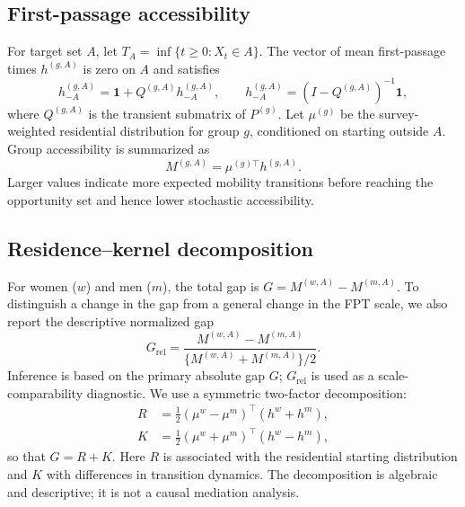 \documentclass[11pt]{article}
\begin{document}
\subsection{First-passage accessibility}
For target set $A$, let $T_A=\inf\{t\geq0:X_t\in A\}$. The vector of mean first-passage times $h^{(g,A)}$ is zero on $A$ and satisfies
\begin{equation}
 h_{-A}^{(g,A)}=\mathbf 1+Q^{(g,A)}h_{-A}^{(g,A)},
 \qquad
 h_{-A}^{(g,A)}=(I-Q^{(g,A)})^{-1}\mathbf 1,
\end{equation}
where $Q^{(g,A)}$ is the transient submatrix of $P^{(g)}$. Let $\mu^{(g)}$ be the survey-weighted residential distribution for group $g$, conditioned on starting outside $A$. Group accessibility is summarized as
\begin{equation}
 M^{(g,A)}=\mu^{(g)\top}h^{(g,A)}.
\end{equation}
Larger values indicate more expected mobility transitions before reaching the opportunity set and hence lower stochastic accessibility.

\subsection{Residence--kernel decomposition}
For women ($w$) and men ($m$), the total gap is $G=M^{(w,A)}-M^{(m,A)}$. To distinguish a change in the gap from a general change in the FPT scale, we also report the descriptive normalized gap
\begin{equation}
 G_{\mathrm{rel}}=
 \frac{M^{(w,A)}-M^{(m,A)}}
 {\{M^{(w,A)}+M^{(m,A)}\}/2}.
\end{equation}
Inference is based on the primary absolute gap $G$; $G_{\mathrm{rel}}$ is used as a scale-comparability diagnostic. We use a symmetric two-factor decomposition:
\begin{align}
 R &= \tfrac12(\mu^w-\mu^m)^\top(h^w+h^m),\\
 K &= \tfrac12(\mu^w+\mu^m)^\top(h^w-h^m),
\end{align}
so that $G=R+K$. Here $R$ is associated with the residential starting distribution and $K$ with differences in transition dynamics. The decomposition is algebraic and descriptive; it is not a causal mediation analysis.
\end{document}
